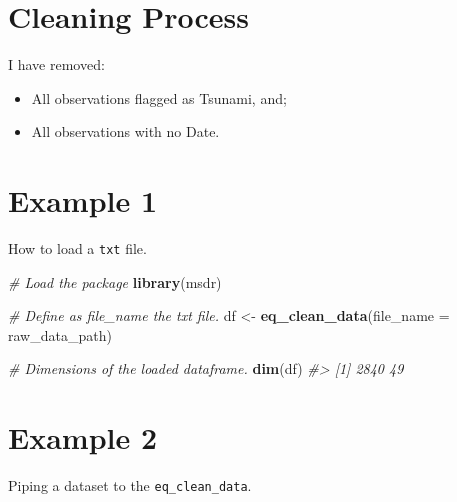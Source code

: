 \documentclass[]{book}
\newenvironment{Shaded}{\begin{snugshade}}{\end{snugshade}}
\newcommand{\KeywordTok}[1]{\textcolor[rgb]{0.13,0.29,0.53}{\textbf{#1}}}
\newcommand{\DataTypeTok}[1]{\textcolor[rgb]{0.13,0.29,0.53}{#1}}
\newcommand{\CharTok}[1]{\textcolor[rgb]{0.31,0.60,0.02}{#1}}
\newcommand{\StringTok}[1]{\textcolor[rgb]{0.31,0.60,0.02}{#1}}
\newcommand{\CommentTok}[1]{\textcolor[rgb]{0.56,0.35,0.01}{\textit{#1}}}
\newcommand{\OperatorTok}[1]{\textcolor[rgb]{0.81,0.36,0.00}{\textbf{#1}}}
\newcommand{\NormalTok}[1]{#1}
\providecommand{\tightlist}{%
  \setlength{\itemsep}{0pt}\setlength{\parskip}{0pt}}
\begin{document}
\section{Cleaning Process}\label{cleaning}

I have removed:

\begin{itemize}
\tightlist
\item
  All observations flagged as Tsunami, and;
\item
  All observations with no Date.
\end{itemize}

\section{Example 1}\label{example_1}

How to load a \texttt{txt} file.

\begin{Shaded}
\begin{Highlighting}[]

\CommentTok{# Load the package}
\KeywordTok{library}\NormalTok{(msdr)}

\CommentTok{# Define as file_name the txt file.}
\NormalTok{df <-}\StringTok{ }\KeywordTok{eq_clean_data}\NormalTok{(}\DataTypeTok{file_name =}\NormalTok{ raw_data_path)}

\CommentTok{# Dimensions of the loaded dataframe.}
\KeywordTok{dim}\NormalTok{(df)}
\CommentTok{#> [1] 2840   49}
\end{Highlighting}
\end{Shaded}

\section{Example 2}\label{example_2}

Piping a dataset to the \texttt{eq\_clean\_data}.

\begin{Shaded}
\end{Shaded}
\end{document}

